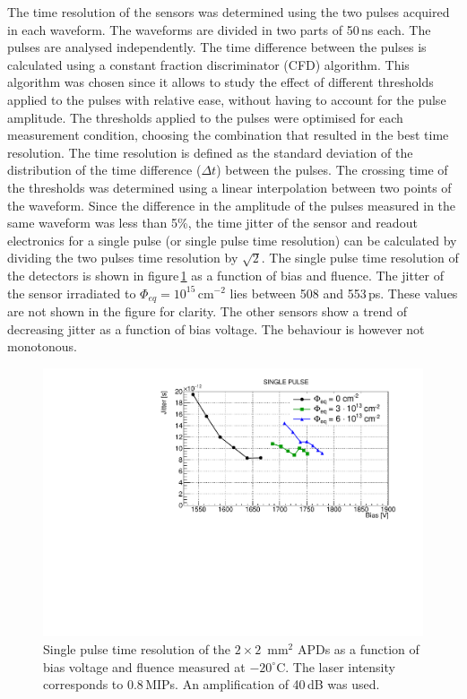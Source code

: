 \documentclass{article}
\begin{document}
The time resolution of the sensors was determined using the two pulses acquired in each waveform.
The waveforms are divided in two parts of 50\,ns each.
The pulses are analysed independently.
The time difference between the pulses is calculated using a constant fraction discriminator (CFD) algorithm.
This algorithm was chosen since it allows to study the effect of different thresholds applied to the pulses with relative ease, without having to account for the pulse amplitude.
The thresholds applied to the pulses were optimised for each measurement condition, choosing the combination that resulted in the best time resolution.
The time resolution is defined as the standard deviation of the distribution of the time difference ($\Delta t$) between the pulses.
The crossing time of the thresholds was determined using a linear interpolation between two points of the waveform.
Since the difference in the amplitude of the pulses measured in the same waveform was less than 5\%, the time jitter of the sensor and readout electronics for a single pulse (or single pulse time resolution) can be calculated by dividing the two pulses time resolution by $\sqrt{2}$.
The single pulse time resolution of the detectors is shown in figure\,\ref{fig:timeRes2x2} as a function of bias and fluence.
The jitter of the sensor irradiated to $\Phi_{eq} = 10^{15}$\,cm$^{-2}$ lies between 508 and 553\,ps.
These values are not shown in the figure for clarity.
The other sensors show a trend of decreasing jitter as a function of bias voltage.
The behaviour is however not monotonous.

\begin{figure}
  \centering
  \includegraphics[width = 0.6 \textwidth]{timeRes2x2APDsNo1e15}
  \caption{Single pulse time resolution of the $2 \times 2$~mm$^2$ APDs as a function of bias voltage and fluence measured at $-20^\circ$C. The laser intensity corresponds to 0.8\,MIPs. An amplification of 40\,dB was used.}
  \label{fig:timeRes2x2}
\end{figure}
\end{document}
